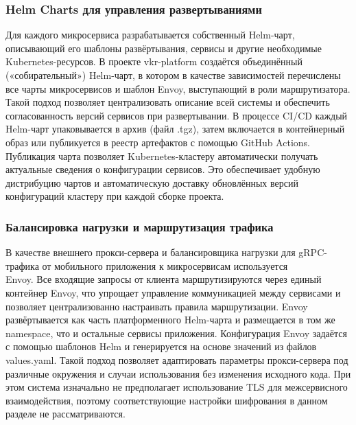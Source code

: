 \subsubsection*{Helm Charts для управления развертываниями}
Для каждого микросервиса разрабатывается собственный Helm-чарт, описывающий его шаблоны развёртывания, сервисы и другие необходимые Kubernetes-ресурсов. В проекте vkr-platform создаётся объединённый («собирательный») Helm-чарт, в котором в качестве зависимостей перечислены все чарты микросервисов и шаблон Envoy, выступающий в роли маршрутизатора. Такой подход позволяет централизовать описание всей системы и обеспечить согласованность версий сервисов при развертывании.
В процессе CI/CD каждый Helm-чарт упаковывается в архив (файл .tgz), затем включается в контейнерный образ или публикуется в реестр артефактов с помощью GitHub Actions. Публикация чарта позволяет Kubernetes-кластеру автоматически получать актуальные сведения о конфигурации сервисов. Это обеспечивает удобную дистрибуцию чартов и автоматическую доставку обновлённых версий конфигураций кластеру при каждой сборке проекта.

\subsubsection*{Балансировка нагрузки и маршрутизация трафика}
В качестве внешнего прокси-сервера и балансировщика нагрузки для gRPC-трафика от мобильного приложения к микросервисам используется \\ Envoy. Все входящие запросы от клиента маршрутизируются через единый контейнер Envoy, что упрощает управление коммуникацией между сервисами и позволяет централизованно настраивать правила маршрутизации. Envoy развёртывается как часть платформенного Helm-чарта и размещается в том же \\ namespace, что и остальные сервисы приложения.
Конфигурация Envoy задаётся с помощью шаблонов Helm и генерируется на основе значений из файлов values.yaml. Такой подход позволяет адаптировать параметры прокси-сервера под различные окружения и случаи использования без изменения исходного кода. При этом система изначально не предполагает использование TLS для межсервисного взаимодействия, поэтому соответствующие настройки шифрования в данном разделе не рассматриваются.

